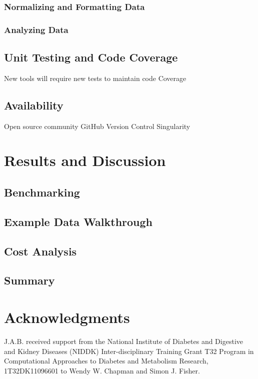 \documentclass[11pt, a4paper, oneside]{article}
\begin{document}
\subsubsection{Normalizing and Formatting Data}

\subsubsection{Analyzing Data}

\subsection{Unit Testing and Code Coverage}
New tools will require new tests to maintain code Coverage

\subsection{Availability}
Open source community
GitHub
Version Control
Singularity


\section*{Results and Discussion}

\subsection{Benchmarking}

\subsection{Example Data Walkthrough}

\subsection{Cost Analysis}

\subsection{Summary}







\section*{Acknowledgments}
J.A.B. received support from the National Institute of Diabetes and Digestive and Kidney Diseases (NIDDK) Inter-disciplinary Training Grant T32 Program in Computational Approaches to Diabetes and Metabolism Research, 1T32DK11096601 to Wendy W. Chapman and Simon J. Fisher.
\end{document}
